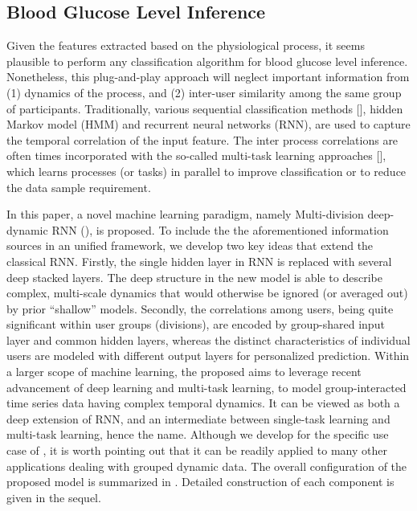 \subsection{Blood Glucose Level Inference}
Given the features extracted based on the physiological process, it seems plausible to perform any classification algorithm for blood glucose level inference.
Nonetheless, this plug-and-play approach will neglect important information from (1) dynamics of the process, and (2) inter-user similarity among the same group of participants.
Traditionally, various sequential classification methods [], \eg hidden Markov model (HMM) and recurrent neural networks (RNN), are used to capture the temporal correlation of the input feature.
The inter process correlations are often times incorporated with the so-called multi-task learning approaches [], which learns processes (or tasks) in parallel to improve classification or to reduce the data sample requirement.

In this paper, a novel machine learning paradigm, namely Multi-division deep-dynamic RNN (\modelname), is proposed.
To include the the aforementioned information sources in an unified framework, we develop two key ideas that extend the classical RNN. Firstly, the single hidden layer in RNN is replaced with several deep stacked layers.
The deep structure in the new model is able to describe complex, multi-scale dynamics that would otherwise be ignored (or averaged out) by prior ``shallow'' models.
Secondly, the correlations among users, being quite significant within user groups (divisions), are encoded by group-shared input layer and common hidden layers, whereas the distinct characteristics of individual users are modeled with different output layers for personalized prediction.
Within a larger scope of machine learning, the proposed \modelname aims to leverage recent advancement of deep learning and multi-task learning, to model group-interacted time series data having complex temporal dynamics.
It can be viewed as both a deep extension of RNN, and an intermediate between single-task learning and multi-task learning, hence the name.
Although we develop \modelname for the specific use case of \sysname, it is worth pointing out that it can be readily applied to many other applications dealing with grouped dynamic data.
The overall configuration of the proposed model is summarized in .
Detailed construction of each component is given in the sequel.

